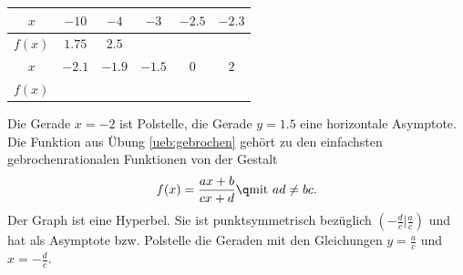 \documentclass[%
11pt,%
twoside,%
titlepage,%
german,%
headsepline%
]{scrartcl}
\newcommand{\spaltenheight}{\rule{0mm}{3ex}}
\newcommand{\spaltensep}{\\[1ex]}
\begin{document}
\begin{table}
\small
\centering
\begin{tabular}{|c|c|c|c|c|c|} \hline
\rowcolor{Gray} $x$ & $-10$ & $-4$ & $-3$ & $-2.5$ & $-2.3$\\ \hline
\rowcolor{lightyellow}\spaltenheight $f(x)$ & $1.75$ & $2.5$ &  &  & \spaltensep \hline
\rowcolor{Gray} $x$ & $-2.1$ & $-1.9$ & $-1.5$ & $0$ & $2$\\ \hline
\rowcolor{lightyellow}\spaltenheight $f(x)$ &  &  &  &  & \spaltensep \hline

\end{tabular}
\end{table}



Die Gerade $x=-2$ ist Polstelle, die Gerade $y= 1.5$ eine horizontale Asymptote.
Die Funktion aus Übung \ref{ueb:gebrochen} gehört zu den einfachsten gebrochenrationalen Funktionen von der Gestalt
$$f(x)=\frac{ax+b}{cx+d}\q\text{mit }ad\neq bc.$$
Der Graph ist eine Hyperbel. Sie ist punktsymmetrisch bezüglich $(-\frac{d}{c}|\frac{a}{c})$ und hat als Asymptote bzw. Polstelle die Geraden mit den Gleichungen $y=\frac{a}{c}$ und $x=-\frac{d}{c}$.
\end{document}
